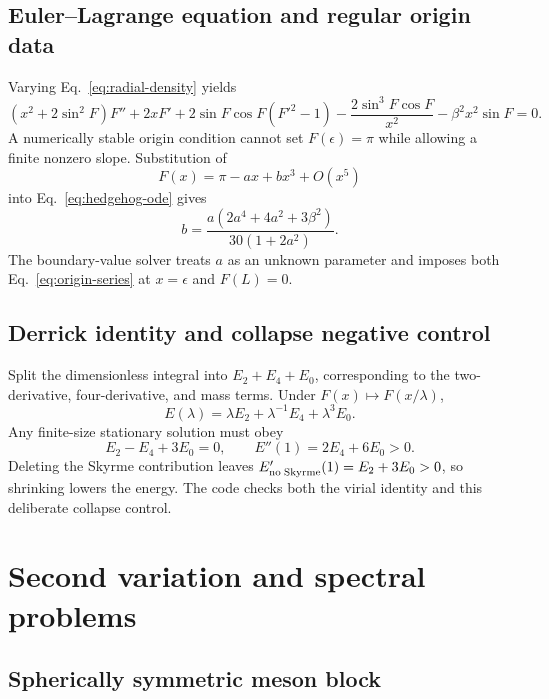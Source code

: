 \documentclass[11pt]{article}
\theoremstyle{definition}
\theoremstyle{remark}
\begin{document}
\subsection{Euler--Lagrange equation and regular origin data}

Varying Eq.~\eqref{eq:radial-density} yields
\begin{equation}
 (x^2+2\sin^2F)F''
 +2xF'
 +2\sin F\cos F(F'^2-1)
 -\frac{2\sin^3F\cos F}{x^2}
 -\beta^2x^2\sin F=0.
 \label{eq:hedgehog-ode}
\end{equation}
A numerically stable origin condition cannot set \(F(\epsilon)=\pi\) while
allowing a finite nonzero slope.  Substitution of
\begin{equation}
 F(x)=\pi-a x+b x^3+O(x^5)
\end{equation}
into Eq.~\eqref{eq:hedgehog-ode} gives
\begin{equation}
 b=\frac{a(2a^4+4a^2+3\beta^2)}{30(1+2a^2)}.
 \label{eq:origin-series}
\end{equation}
The boundary-value solver treats \(a\) as an unknown parameter and imposes
both Eq.~\eqref{eq:origin-series} at \(x=\epsilon\) and \(F(L)=0\).

\subsection{Derrick identity and collapse negative control}

Split the dimensionless integral into \(E_2+E_4+E_0\), corresponding to
the two-derivative, four-derivative, and mass terms.  Under
\(F(x)\mapsto F(x/\lambda)\),
\begin{equation}
 E(\lambda)=\lambda E_2+\lambda^{-1}E_4+\lambda^3E_0.
\end{equation}
Any finite-size stationary solution must obey
\begin{equation}
 E_2-E_4+3E_0=0,\qquad
 E''(1)=2E_4+6E_0>0.
 \label{eq:derrick}
\end{equation}
Deleting the Skyrme contribution leaves
\(E'_{\rm no\;Skyrme}(1)=E_2+3E_0>0\), so shrinking lowers the energy.
The code checks both the virial identity and this deliberate collapse
control.

\section{Second variation and spectral problems}

\subsection{Spherically symmetric meson block}
\end{document}
